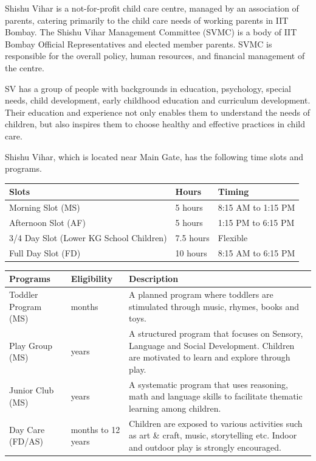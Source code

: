 \documentclass[
  10pt,
  a5paper,
  10pt,
  openany]{amsbook}
\begin{document}
Shishu Vihar is a not-for-profit child care centre, managed by an
association of parents, catering primarily to the child care needs of
working parents in IIT Bombay. The Shishu Vihar Management Committee
(SVMC) is a body of IIT Bombay Official Representatives and elected
member parents. SVMC is responsible for the overall policy, human
resources, and financial management of the centre.

SV has a group of people with backgrounds in education, psychology,
special needs, child development, early childhood education and
curriculum development. Their education and experience not only enables
them to understand the needs of children, but also inspires them to
choose healthy and effective practices in child care.

Shishu Vihar, which is located near Main Gate, has the following time
slots and programs.

\begin{longtable}[]{@{}lll@{}}
\toprule\noalign{}
Slots & Hours & Timing \\
\midrule\noalign{}
\endhead
\bottomrule\noalign{}
\endlastfoot
Morning Slot (MS) & 5 hours & 8:15 AM to 1:15 PM \\
Afternoon Slot (AF) & 5 hours & 1:15 PM to 6:15 PM \\
3/4 Day Slot (Lower KG School Children) & 7.5 hours & Flexible \\
Full Day Slot (FD) & 10 hours & 8:15 AM to 6:15 PM \\
\end{longtable}

\begin{longtable}[]{@{}
  >{\raggedright\arraybackslash}p{}
  >{\raggedright\arraybackslash}p{}
  >{\raggedright\arraybackslash}p{}@{}}
\toprule\noalign{}
\begin{minipage}[b]{\linewidth}\raggedright
Programs
\end{minipage} & \begin{minipage}[b]{\linewidth}\raggedright
Eligibility
\end{minipage} & \begin{minipage}[b]{\linewidth}\raggedright
Description
\end{minipage} \\
\midrule\noalign{}
\endhead
\bottomrule\noalign{}
\endlastfoot
Toddler Program (MS) & 18 months & A planned program where toddlers are
stimulated through music, rhymes, books and toys. \\
Play Group (MS) & 2 years & A structured program that focuses on
Sensory, Language and Social Development. Children are motivated to
learn and explore through play. \\
Junior Club (MS) & 3 years & A systematic program that uses reasoning,
math and language skills to facilitate thematic learning among
children. \\
Day Care (FD/AS) & 18 months to 12 years & Children are exposed to
various activities such as art \& craft, music, storytelling etc. Indoor
and outdoor play is strongly encouraged. \\
\end{longtable}
\end{document}
